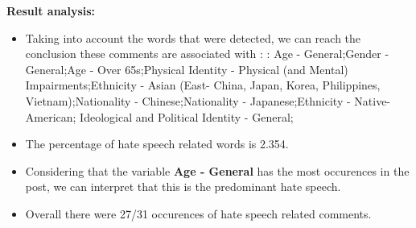 \documentclass[11pt]{article}
\begin{document}
\textbf{\Large Result analysis:}

\begin{itemize}\item Taking into account the words that were detected, we can reach the conclusion these comments are associated with : : Age - General;Gender - General;Age - Over 65s;Physical Identity - Physical (and Mental) Impairments;Ethnicity - Asian (East- China, Japan, Korea, Philippines, Vietnam);Nationality - Chinese;Nationality - Japanese;Ethnicity - Native-American; Ideological and Political Identity - General;%

\item The percentage of hate speech related words is 2.354.

\item Considering that the variable \textbf{Age - General} has the most occurences in the post, we can interpret that this is the predominant hate speech.

\item Overall there were 27/31 occurences of hate speech related comments.\end{itemize}
\end{document}
